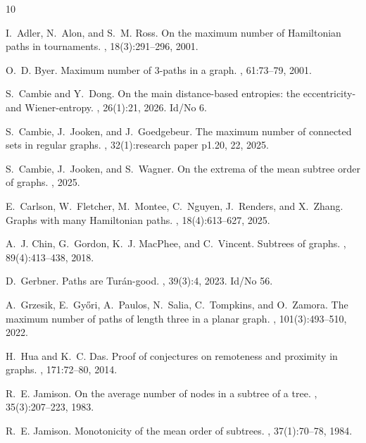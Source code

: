 \documentclass[a4paper,11pt]{article}
\begin{document}
\begin{thebibliography}{10}

I.~Adler, N.~Alon, and S.~M. Ross.
\newblock On the maximum number of {Hamiltonian} paths in tournaments.
, 18(3):291--296, 2001.

O.~D. Byer.
\newblock Maximum number of 3-paths in a graph.
, 61:73--79, 2001.

S.~Cambie and Y.~Dong.
\newblock On the main distance-based entropies: the eccentricity- and {Wiener}-entropy.
, 26(1):21, 2026.
\newblock Id/No 6.

S.~Cambie, J.~Jooken, and J.~Goedgebeur.
\newblock The maximum number of connected sets in regular graphs.
, 32(1):research paper p1.20, 22, 2025.

S.~Cambie, J.~Jooken, and S.~Wagner.
\newblock On the extrema of the mean subtree order of graphs.
, 2025.

E.~Carlson, W.~Fletcher, M.~Montee, C.~Nguyen, J.~Renders, and X.~Zhang.
\newblock Graphs with many {Hamiltonian} paths.
, 18(4):613--627, 2025.

A.~J. Chin, G.~Gordon, K.~J. MacPhee, and C.~Vincent.
\newblock Subtrees of graphs.
, 89(4):413--438, 2018.

D.~Gerbner.
\newblock Paths are {Tur{\'a}n}-good.
, 39(3):4, 2023.
\newblock Id/No 56.

A.~Grzesik, E.~Gy{\H{o}}ri, A.~Paulos, N.~Salia, C.~Tompkins, and O.~Zamora.
\newblock The maximum number of paths of length three in a planar graph.
, 101(3):493--510, 2022.

H.~Hua and K.~C. Das.
\newblock Proof of conjectures on remoteness and proximity in graphs.
, 171:72--80, 2014.

R.~E. Jamison.
\newblock On the average number of nodes in a subtree of a tree.
, 35(3):207--223, 1983.

R.~E. Jamison.
\newblock Monotonicity of the mean order of subtrees.
, 37(1):70--78, 1984.


\end{thebibliography}
\end{document}
